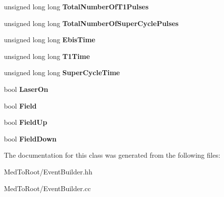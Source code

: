 \begin{DoxyCompactItemize}
\item 
\hypertarget{class_event_builder_ac03ad97da655cd74a68e443e3bae6704}{unsigned long long {\bfseries Total\-Number\-Of\-T1\-Pulses}}\label{class_event_builder_ac03ad97da655cd74a68e443e3bae6704}

\item 
\hypertarget{class_event_builder_acd34a967b6313c6a0e24c1d71bf4b035}{unsigned long long {\bfseries Total\-Number\-Of\-Super\-Cycle\-Pulses}}\label{class_event_builder_acd34a967b6313c6a0e24c1d71bf4b035}

\item 
\hypertarget{class_event_builder_a6ed13a2aacc3504863fe52ccc0f8ee7f}{unsigned long long {\bfseries Ebis\-Time}}\label{class_event_builder_a6ed13a2aacc3504863fe52ccc0f8ee7f}

\item 
\hypertarget{class_event_builder_a728021fad9536a2e0b14e2a98bc8fc52}{unsigned long long {\bfseries T1\-Time}}\label{class_event_builder_a728021fad9536a2e0b14e2a98bc8fc52}

\item 
\hypertarget{class_event_builder_a3692a066973ab0e2efab7eeaab620886}{unsigned long long {\bfseries Super\-Cycle\-Time}}\label{class_event_builder_a3692a066973ab0e2efab7eeaab620886}

\item 
\hypertarget{class_event_builder_a89b87c26a373bdaf01f473c835706422}{bool {\bfseries Laser\-On}}\label{class_event_builder_a89b87c26a373bdaf01f473c835706422}

\item 
\hypertarget{class_event_builder_a2b9e0006f22d5cb92c0eb383850a9724}{bool {\bfseries Field}}\label{class_event_builder_a2b9e0006f22d5cb92c0eb383850a9724}

\item 
\hypertarget{class_event_builder_a0bf9203feb4717fdb210ac451418b221}{bool {\bfseries Field\-Up}}\label{class_event_builder_a0bf9203feb4717fdb210ac451418b221}

\item 
\hypertarget{class_event_builder_a5980c7ded97b54839b7dc8b0a807b72a}{bool {\bfseries Field\-Down}}\label{class_event_builder_a5980c7ded97b54839b7dc8b0a807b72a}

\end{DoxyCompactItemize}


The documentation for this class was generated from the following files\-:\begin{DoxyCompactItemize}
\item 
Med\-To\-Root/Event\-Builder.\-hh\item 
Med\-To\-Root/Event\-Builder.\-cc\end{DoxyCompactItemize}
